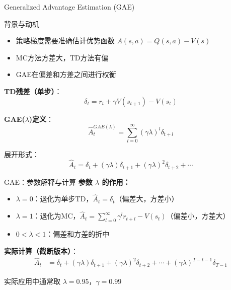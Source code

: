 \documentclass{beamer}
\begin{document}
\begin{frame}{Generalized Advantage Estimation (GAE)}
    \begin{block}{背景与动机}
        \begin{itemize}
            \item 策略梯度需要准确估计优势函数 $A(s,a) = Q(s,a) - V(s)$
            \item MC方法方差大，TD方法有偏
            \item GAE在偏差和方差之间进行权衡
        \end{itemize}
    \end{block}
    
    \textbf{TD残差（单步）}：
    \[
    \delta_t = r_t + \gamma V(s_{t+1}) - V(s_t)
    \]
    
    \textbf{GAE($\lambda$)定义}：
    \[
    \hat{A}_t^{GAE(\lambda)} = \sum_{l=0}^{\infty} (\gamma\lambda)^l \delta_{t+l}
    \]
    
    展开形式：
    \[
    \hat{A}_t = \delta_t + (\gamma\lambda)\delta_{t+1} + (\gamma\lambda)^2\delta_{t+2} + \cdots
    \]
\end{frame}

\begin{frame}{GAE：参数解释与计算}
    \textbf{参数 $\lambda$ 的作用：}
    \begin{itemize}
        \item $\lambda = 0$：退化为单步TD，$\hat{A}_t = \delta_t$（偏差大，方差小）
        \item $\lambda = 1$：退化为MC，$\hat{A}_t = \sum_{l=0}^{\infty}\gamma^l r_{t+l} - V(s_t)$（偏差小，方差大）
        \item $0 < \lambda < 1$：偏差和方差的折中
    \end{itemize}
    
    \vspace{0.3cm}
    
    \textbf{实际计算（截断版本）}：
    \begin{align*}
    \hat{A}_t &= \delta_t + (\gamma\lambda)\delta_{t+1} + (\gamma\lambda)^2\delta_{t+2} + \cdots + (\gamma\lambda)^{T-t-1}\delta_{T-1}
    \end{align*}
    
    \vspace{0.3cm}
    {\small 实际应用中通常取 $\lambda = 0.95$，$\gamma = 0.99$}
\end{frame}
\end{document}
